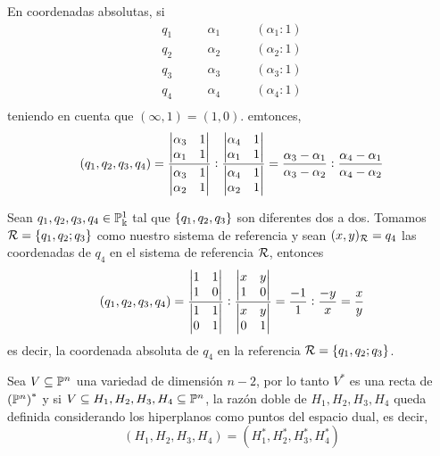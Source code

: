 \begin{obs}
  En coordenadas absolutas, si
  \[
    \begin{aligned}
      q_1 &\qquad \alpha_1 &\qquad (\alpha_1:1) \\
      q_2 &\qquad \alpha_2 &\qquad (\alpha_2:1) \\
      q_3 &\qquad \alpha_3 &\qquad (\alpha_3:1) \\
      q_4 &\qquad \alpha_4 &\qquad (\alpha_4:1) \\
    \end{aligned}
  \]
  teniendo en cuenta que $(\infty,1) = (1,0)$. emtonces,
  \[
    \left( q_1,q_2,q_3,q_4 \right) = \frac{\begin{vmatrix}\alpha_3 & 1 \\ \alpha_1 & 1\end{vmatrix}}
    {\begin{vmatrix}\alpha_3 & 1 \\ \alpha_2 & 1\end{vmatrix}}:\frac{\begin{vmatrix}\alpha_4 & 1 \\ \alpha_1 & 1\end{vmatrix}}
    {\begin{vmatrix}\alpha_4 & 1 \\ \alpha_2 & 1\end{vmatrix}} =
    \frac{\alpha_3-\alpha_1}{\alpha_3-\alpha_2}:\frac{\alpha_4-\alpha_1}{\alpha_4-\alpha_2}
  \]
\end{obs}
\begin{obs}\label{obs:rzdo_ref}
  Sean $q_1,q_2,q_3,q_4 \in \mathbb{P}^1_\Bbbk$ tal que $\left\{q_1,q_2,q_3\right\}$ son diferentes dos a dos.
  Tomamos $\mathcal{R} = \left\{q_1,q_2;q_3\right\}$ como nuestro sistema de referencia y sean $(x,y)_{\mathcal{R}} = q_4$
  las coordenadas de $q_4$ en el sistema de referencia $\mathcal{R}$, entonces
  \[
    \left( q_1,q_2,q_3,q_4 \right) = \frac{\begin{vmatrix}1 & 1 \\ 1 & 0\end{vmatrix}}
    {\begin{vmatrix}1 & 1 \\ 0 & 1\end{vmatrix}}:\frac{\begin{vmatrix}x & y \\ 1 & 0\end{vmatrix}}
    {\begin{vmatrix}x & y \\ 0 & 1\end{vmatrix}} = \frac{-1}{1}:\frac{-y}{x} = \frac{x}{y}
  \]
  es decir, la coordenada absoluta de $q_4$ en la referencia $\mathcal{R} = \left\{q_1,q_2;q_3\right\}$.
\end{obs}
\begin{obs}
 Sea $V \subseteq \mathbb{P}^n$ una variedad de dimensión $n-2$, por lo tanto $V^*$ es una recta de
 $\left( \mathbb{P}^n \right)^*$ y si $V \subseteq H_1,H_2,H_3,H_4 \subseteq \mathbb{P}^n$, la razón doble
 de $H_1,H_2,H_3,H_4$ queda definida considerando los hiperplanos como puntos del espacio dual,
 es decir,
 \[
  (H_1,H_2,H_3,H_4) = (H_1^*,H_2^*,H_3^*,H_4^*)
 \]
\end{obs}

